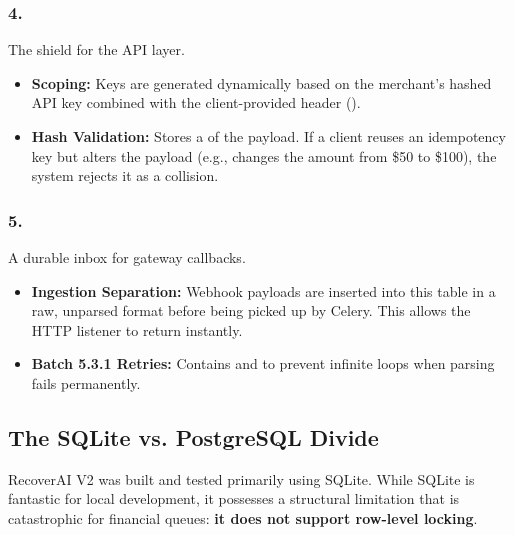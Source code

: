 \vspace{0.4cm}

\subsubsection{4. }
The shield for the API layer. 
\begin{itemize}
    \item \textbf{Scoping:} Keys are generated dynamically based on the merchant's hashed API key combined with the client-provided header ().
    \item \textbf{Hash Validation:} Stores a  of the payload. If a client reuses an idempotency key but alters the payload (e.g., changes the amount from \$50 to \$100), the system rejects it as a collision.
\end{itemize}

\vspace{0.4cm}

\subsubsection{5. }
A durable inbox for gateway callbacks.
\begin{itemize}
    \item \textbf{Ingestion Separation:} Webhook payloads are inserted into this table in a raw, unparsed format before being picked up by Celery. This allows the HTTP listener to return  instantly.
    \item \textbf{Batch 5.3.1 Retries:} Contains  and  to prevent infinite loops when parsing fails permanently.
\end{itemize}

\vspace{0.8cm}

\subsection{The SQLite vs. PostgreSQL Divide}

\begin{tcolorbox}[warningbox={The Danger of SQLite in Financial Systems}]
RecoverAI V2 was built and tested primarily using SQLite. While SQLite is fantastic for local development, it possesses a structural limitation that is catastrophic for financial queues: \textbf{it does not support row-level locking}.
\end{tcolorbox}

